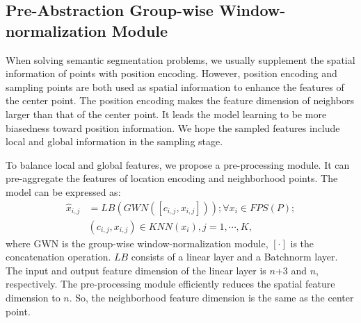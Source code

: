 \documentclass[10pt,twocolumn,letterpaper]{article}
\begin{document}
    \subsection{Pre-Abstraction Group-wise Window-normalization Module}

        When solving semantic segmentation problems, we usually supplement the spatial information of points with position encoding.
        However, position encoding and sampling points are both used as spatial information to enhance the features of the center point.
        The position encoding makes the feature dimension of neighbors larger than that of the center point.
        It leads the model learning to be more biasedness toward position information.
        We hope the sampled features include local and global information in the sampling stage.

        To balance local and global features, we propose a pre-processing module. It can pre-aggregate the features of location encoding and neighborhood points. The model can be expressed as:
        \begin{equation}
            \begin{aligned}
        {\hat x_{i,j}}& = LB\left( {GWN\left( {\left[ {{c_{i,j}},{x_{i,j}}} \right]} \right)} \right); \forall {x_i} \in FPS\left( P \right); \\
        &\left( {{c_{i,j}},{x_{i,j}}} \right) \in KNN\left( {{x_i}} \right),j = 1, \cdots ,K,
            \end{aligned}
        \end{equation}
        where GWN is the group-wise window-normalization module,
        $\left[  \cdot  \right]$ is the concatenation operation. $LB$ consists of a linear layer and a Batchnorm layer. The input and output feature dimension of the linear layer is $n$+3 and $n$, respectively. The pre-processing module efficiently reduces the spatial feature dimension to $n$. So, the neighborhood feature dimension is the same as the center point.
\end{document}
